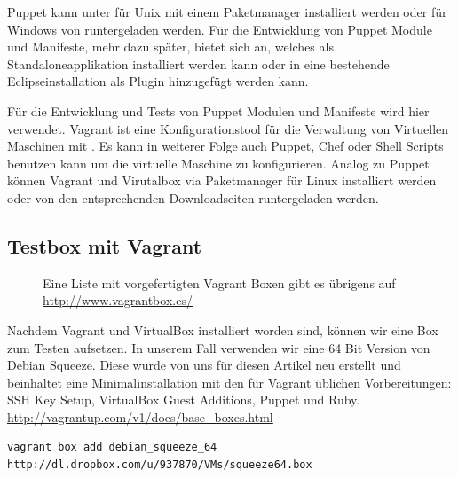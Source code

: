 \documentclass[12pt,a4paper,ngerman]{article}
\begin{document}
Puppet kann unter für Unix mit einem Paketmanager installiert werden oder für Windows von \cite{puppetlabs} runtergeladen werden. Für die Entwicklung von Puppet Module und Manifeste, mehr dazu später, bietet sich \cite{geppeto} an, welches als Standaloneapplikation installiert werden kann oder in eine bestehende Eclipseinstallation als Plugin hinzugefügt werden kann.

Für die Entwicklung und Tests von Puppet Modulen und Manifeste wird hier \cite{vagrant} verwendet. Vagrant ist eine Konfigurationstool für die Verwaltung von Virtuellen Maschinen mit \cite{virtualbox}. Es kann in weiterer Folge auch Puppet, Chef oder Shell Scripts benutzen kann um die virtuelle Maschine zu konfigurieren. Analog zu Puppet können Vagrant und Virutalbox via Paketmanager für Linux installiert werden oder von den entsprechenden Downloadseiten runtergeladen werden.

\subsection{Testbox mit Vagrant}

\begin{figure}
\vspace{-15pt}
\begin{boxedminipage}{5cm}
Eine Liste mit vorgefertigten Vagrant Boxen gibt es übrigens auf \url{http://www.vagrantbox.es/}
\end{boxedminipage}
\vspace{-15pt}
\end{figure}

Nachdem Vagrant und VirtualBox installiert worden sind, können wir eine Box zum Testen aufsetzen. In unserem Fall verwenden wir eine 64 Bit Version von Debian Squeeze. Diese wurde von uns für diesen Artikel neu erstellt und beinhaltet eine Minimalinstallation mit den für Vagrant üblichen Vorbereitungen: SSH Key Setup, VirtualBox Guest Additions, Puppet und Ruby. \url{http://vagrantup.com/v1/docs/base_boxes.html}

\begin{lstlisting}[caption=Download der Vagrant Box, label=vagrant-add]
vagrant box add debian_squeeze_64 http://dl.dropbox.com/u/937870/VMs/squeeze64.box
\end{lstlisting}
\end{document}
